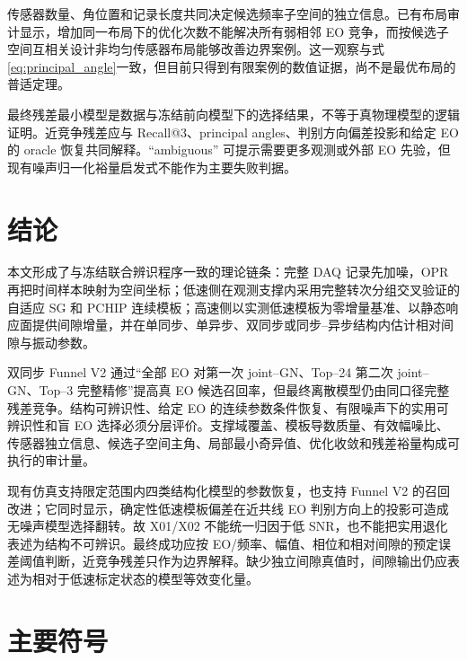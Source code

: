 \documentclass[UTF8,12pt,a4paper]{ctexart}
\begin{document}
传感器数量、角位置和记录长度共同决定候选频率子空间的独立信息。已有布局审计显示，增加同一布局下的优化次数不能解决所有弱相邻 EO 竞争，而按候选子空间互相关设计非均匀传感器布局能够改善边界案例。这一观察与式\eqref{eq:principal_angle}一致，但目前只得到有限案例的数值证据，尚不是最优布局的普适定理。

最终残差最小模型是数据与冻结前向模型下的选择结果，不等于真物理模型的逻辑证明。近竞争残差应与 Recall@3、principal angles、判别方向偏差投影和给定 EO 的 oracle 恢复共同解释。``ambiguous'' 可提示需要更多观测或外部 EO 先验，但现有噪声归一化裕量启发式不能作为主要失败判据。

\section{结论}

本文形成了与冻结联合辨识程序一致的理论链条：完整 DAQ 记录先加噪，OPR 再把时间样本映射为空间坐标；低速侧在观测支撑内采用完整转次分组交叉验证的自适应 SG 和 PCHIP 连续模板；高速侧以实测低速模板为零增量基准、以静态响应面提供间隙增量，并在单同步、单异步、双同步或同步--异步结构内估计相对间隙与振动参数。

双同步 Funnel V2 通过“全部 EO 对第一次 joint--GN、Top--24 第二次 joint--GN、Top--3 完整精修”提高真 EO 候选召回率，但最终离散模型仍由同口径完整残差竞争。结构可辨识性、给定 EO 的连续参数条件恢复、有限噪声下的实用可辨识性和盲 EO 选择必须分层评价。支撑域覆盖、模板导数质量、有效幅噪比、传感器独立信息、候选子空间主角、局部最小奇异值、优化收敛和残差裕量构成可执行的审计量。

现有仿真支持限定范围内四类结构化模型的参数恢复，也支持 Funnel V2 的召回改进；它同时显示，确定性低速模板偏差在近共线 EO 判别方向上的投影可造成无噪声模型选择翻转。故 X01/X02 不能统一归因于低 SNR，也不能把实用退化表述为结构不可辨识。最终成功应按 EO/频率、幅值、相位和相对间隙的预定误差阈值判断，近竞争残差只作为边界解释。缺少独立间隙真值时，间隙输出仍应表述为相对于低速标定状态的模型等效变化量。

\section*{主要符号}
\end{document}
